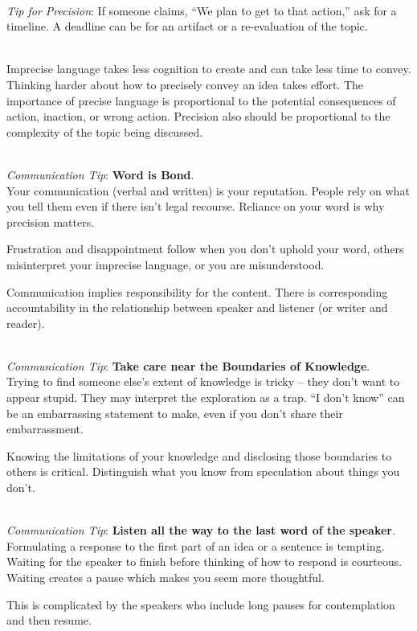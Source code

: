 \ \\
\textit{Tip for Precision}: If someone claims, ``We plan to get to that action,'' ask for a timeline. A deadline can be for an artifact or a re-evaluation of the topic.

\ \\
Imprecise language takes less cognition to create and can take less time to convey. Thinking harder about how to precisely convey an idea takes effort. 
The importance of precise language is proportional to the potential consequences of action, inaction, or wrong action.
Precision also should be proportional to the complexity of the topic being discussed. 

\ \\
\textit{Communication Tip}: \textbf{Word is Bond\label{sec:word-is-bond}}.\\
Your communication (verbal and written) is your reputation. People rely on what you tell them even if there isn't legal recourse. Reliance on your word is why precision matters. 

Frustration and disappointment follow when you don't uphold your word, others misinterpret your imprecise language, or you are misunderstood.

Communication implies responsibility for the content.  There is corresponding accountability in the relationship between speaker and listener (or writer and reader).

\ \\
\textit{Communication Tip}: \textbf{Take care near the Boundaries of Knowledge}.\\
Trying to find someone else's extent of knowledge is tricky -- they don't want to appear stupid. They may interpret the exploration as a trap. ``I don't know'' can be an embarrassing statement to make, even if you don't share their embarrassment. 

Knowing the limitations of your knowledge and disclosing those boundaries to others is critical. Distinguish what you know from speculation about things you don't. 

\ \\
\textit{Communication Tip}: \textbf{Listen all the way to the last word of the speaker}.\\
Formulating a response to the first part of an idea or a sentence is tempting. Waiting for the speaker to finish before thinking of how to respond is courteous. Waiting creates a pause which makes you seem more thoughtful. 

This is complicated by the speakers who include long pauses for contemplation and then resume. 

